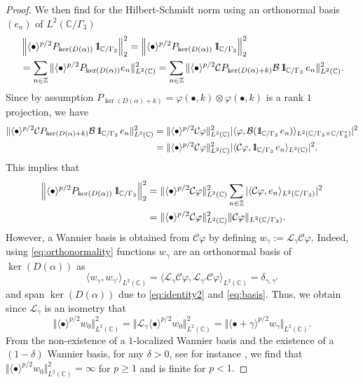 \documentclass[reqno,12pt,letterpaper]{amsart}
\newcommand{\CC}{{\mathbb C}}
\newcommand{\ZZ}{{\mathbb Z}}
\numberwithin{equation}{section}
\def\indic{\operatorname{1\hskip-2.75pt\relax l}}
\begin{document}
\begin{proof}
We then find for the Hilbert-Schmidt norm using an orthonormal basis $(e_n)$ of $L^2(\CC/\Gamma_3)$
\[ \begin{split} 
&\left\lVert \langle \bullet \rangle^{p/2} P_{\ker(D(\alpha))}\indic_{\CC/\Gamma_3} \right\rVert_2^2=\left\lVert \langle \bullet \rangle^{p/2} P_{\ker(D(\alpha))}\indic_{\CC/\Gamma_3} \right\rVert_2^2\\
&=\sum_{n \in \ZZ} \Vert  \langle \bullet \rangle^{p/2} P_{\ker(D(\alpha))}e_n \Vert^2_{L^2(\CC)} =\sum_{n \in \ZZ} \Vert  \langle \bullet \rangle^{p/2} \mathcal C P_{\ker(D(\alpha)+k)} \mathcal B \indic_{\CC/\Gamma_3} e_{n} \Vert^2_{L^2(\CC)}. \end{split} \]
Since by assumption $P_{\ker(D(\alpha)+k)} = \varphi(\bullet,k) \otimes \varphi(\bullet,k) $ is a rank $1$ projection, we have 
\[ \begin{split}
\Vert  \langle \bullet \rangle^{p/2} \mathcal C P_{\ker(D(\alpha)+k)} \mathcal B \indic_{\CC/\Gamma_3} e_{n} \Vert^2_{L^2(\CC)} &=\Vert \langle \bullet \rangle^{p/2} \mathcal C \varphi \Vert^2_{L^2(\CC)} \vert \langle \varphi, \mathcal B( \indic_{\CC/\Gamma_3} e_{n} ) \rangle_{L^2(\CC/\Gamma_3 \times \CC/\Gamma_3^*)}\vert^2 \\
&=\Vert \langle \bullet \rangle^{p/2} \mathcal C \varphi \Vert^2_{L^2(\CC)} \vert \langle \mathcal C\varphi, \indic_{\CC/\Gamma_3} e_{n}  \rangle_{L^2(\CC)}\vert^2.\end{split} \]
This implies that 
\[\begin{split} \left\lVert \langle \bullet \rangle^{p/2}P_{\ker(D(\alpha))}\indic_{\CC/\Gamma_3} \right\rVert_2^2 &= \Vert \langle \bullet \rangle^{p/2} \mathcal C \varphi \Vert^2_{L^2(\CC)} \sum_{n\in \mathbb Z} \vert \langle \mathcal C\varphi, e_{n}  \rangle_{L^2(\CC/\Gamma_3)}\vert^2\\
 &=\Vert \langle \bullet \rangle^{p/2} \mathcal C \varphi \Vert^2_{L^2(\CC)} \Vert \mathcal C \varphi \Vert_{L^2(\CC/\Gamma_3)}. \end{split}\]
 However, a Wannier basis is obtained from $\mathcal C\varphi$ by defining $w_{\gamma}:=\mathscr L_{\gamma} \mathcal C \varphi$. Indeed, using \eqref{eq:orthonormality} functions $w_{\gamma}$ are an orthonormal basis of $\ker(D(\alpha))$ as \[ \langle w_{\gamma},w_{\gamma'} \rangle_{L^2(\CC)} = \langle \mathscr L_{\gamma}\mathcal C \varphi ,  \mathscr L_{\gamma'}\mathcal C \varphi \rangle_{L^2(\CC)} = \delta_{\gamma,\gamma'}\]
 and span $\ker(D(\alpha))$ due to \eqref{eq:identity2} and \eqref{eq:basis}.  
 Thus, we obtain since $\mathscr L_{\gamma}$ is an isometry that  $$\Vert \langle \bullet \rangle^{p/2} w_0 \Vert^2_{L^2(\CC)} = \Vert \mathscr L_{\gamma} \langle \bullet \rangle^{p/2} w_0 \Vert^2_{L^2(\CC)} = \Vert \langle \bullet + \gamma \rangle^{p/2} w_{\gamma}\Vert_{L^2(\CC)}.$$
From the non-existence of a $1$-localized Wannier basis and the existence of a $(1-\delta)$ Wannier basis, for any $\delta>0$, see for instance \cite{MPPT}, we find that $\Vert \langle \bullet \rangle^{p/2} w_0 \Vert^2_{L^2(\CC)}=\infty$ for $p\ge 1$ and is finite for $p<1.$

 \end{proof}
\end{document}

